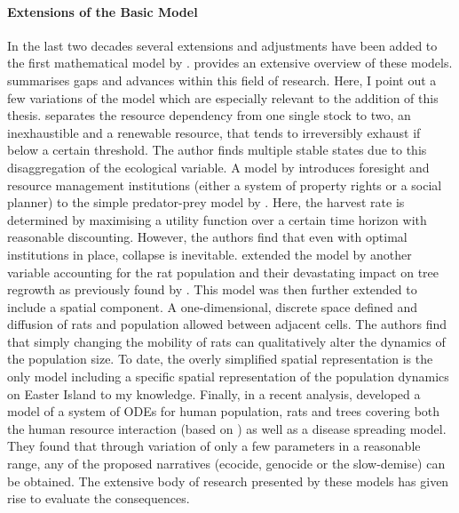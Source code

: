 \paragraph{Extensions of the Basic Model}
In the last two decades several extensions and adjustments have been added to the first mathematical model by \citet{Brander1998}.
\citet{Reuveny2012} provides an extensive overview of these models.
\citet{Merico2017} summarises gaps and advances within this field of research. 
Here, I point out a few variations of the model which are especially relevant to the addition of this thesis.
\citet{dAlessandro2007} separates the resource dependency from one single stock to two, an inexhaustible and a renewable resource, that tends to irreversibly exhaust if below a certain threshold.
The author finds multiple stable states due to this disaggregation of the ecological variable. 
A model by \citet{Good2006} introduces foresight and resource management institutions (either a system of property rights or a social planner) to the simple predator-prey model by \citet{Brander1998}.
Here, the harvest rate is determined by maximising a utility function over a certain time horizon with reasonable discounting.
However, the authors find that even with optimal institutions in place, collapse is inevitable.
\citet{Basener2008} extended the model by another variable accounting for the rat population and their devastating impact on tree regrowth as previously found by \citet{Hunt2007}. 
This model was then further extended \citep{Basener2011} to include a spatial component. 
A one-dimensional, discrete space defined and diffusion of rats and population allowed between adjacent cells. 
The authors find that simply changing the mobility of rats can qualitatively alter the dynamics of the population size.
To date, the overly simplified spatial representation is the only model including a specific spatial representation of the population dynamics on Easter Island to my knowledge.
Finally, in a recent analysis, \citet{Brandt2015} developed a model of a system of ODEs for human population, rats and trees covering both the human resource interaction (based on \citet{Basener2008}) as well as a disease spreading model.
They found that through variation of only a few parameters in a reasonable range, any of the proposed narratives (ecocide, genocide or the slow-demise) can be obtained.
The extensive body of research presented by these models has given rise to evaluate the consequences. 

